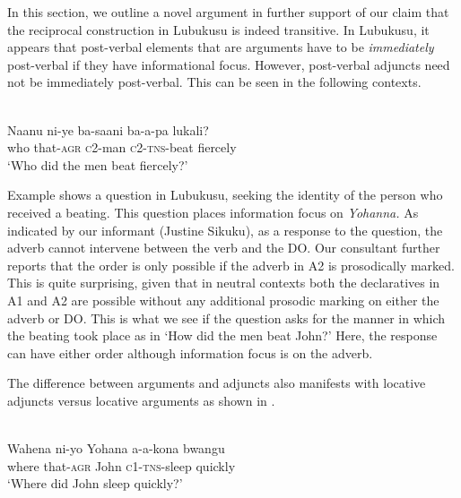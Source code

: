 \documentclass[output=paper]{langsci/langscibook}
\begin{document}
In this section, we outline a novel argument in further support of our claim that the reciprocal construction in Lubukusu is indeed transitive. In Lubukusu, it appears that post-verbal elements that are arguments have to be \textit{immediately} post-verbal if they have informational focus. However, post-verbal adjuncts need not be immediately post-verbal. This can be seen in the following contexts.



\ea\label{ex:safir:14}
\settowidth{}
  \\
\gll Naanu  ni-ye    ba-saani   ba-a-pa   lukali? \\
who  that-\textsc{agr}   \textsc{c}2-man   \textsc{c}2-\textsc{tns}-beat   fiercely\\
\glt ‘Who did the men beat fiercely?’ \\
\z
\z


Example  shows a question in Lubukusu, seeking the identity of the person who received a beating. This question places information focus on \textit{Yohanna.} As indicated by our informant (Justine Sikuku), as a response to the question, the adverb cannot intervene between the verb and the DO. Our consultant further reports that the order is only possible if the adverb in A2 is prosodically marked. This is quite surprising, given that in neutral contexts both the declaratives in A1 and A2 are possible without any additional prosodic marking on either the adverb or DO. This is what we see if the question asks for the manner in which the beating took place as in ‘How did the men beat John?’ Here, the response can have either order although information focus is on the adverb. 

The difference between arguments and adjuncts also manifests with locative adjuncts versus locative arguments as shown in .  


\ea\label{ex:safir:15}
\settowidth{}
  \\
\gll Wahena  ni-yo    Yohana  a-a-kona  bwangu \\
where     that-\textsc{agr}   John     \textsc{c1-tns}-sleep  quickly \\
\glt ‘Where did John sleep quickly?’ \\
\z
\z
{}
\end{document}
